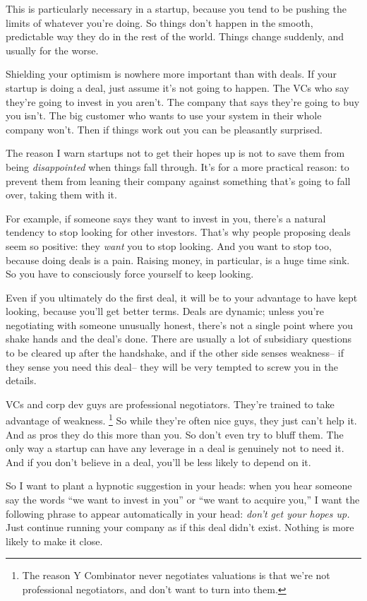 \documentclass[12pt]{book}
\begin{document}
This is particularly necessary in a startup, because you tend to be
pushing the limits of whatever you're doing. So things don't happen in
the smooth, predictable way they do in the rest of the world. Things
change suddenly, and usually for the worse.

Shielding your optimism is nowhere more important than with deals. If
your startup is doing a deal, just assume it's not going to happen. The
VCs who say they're going to invest in you aren't. The company that says
they're going to buy you isn't. The big customer who wants to use your
system in their whole company won't. Then if things work out you can be
pleasantly surprised.

The reason I warn startups not to get their hopes up is not to save them
from being \emph{disappointed} when things fall through. It's for a more
practical reason: to prevent them from leaning their company against
something that's going to fall over, taking them with it.

For example, if someone says they want to invest in you, there's a
natural tendency to stop looking for other investors. That's why people
proposing deals seem so positive: they \emph{want} you to stop looking.
And you want to stop too, because doing deals is a pain. Raising money,
in particular, is a huge time sink. So you have to consciously force
yourself to keep looking.

Even if you ultimately do the first deal, it will be to your advantage
to have kept looking, because you'll get better terms. Deals are
dynamic; unless you're negotiating with someone unusually honest,
there's not a single point where you shake hands and the deal's done.
There are usually a lot of subsidiary questions to be cleared up after
the handshake, and if the other side senses weakness-- if they sense you
need this deal-- they will be very tempted to screw you in the details.

VCs and corp dev guys are professional negotiators. They're trained to
take advantage of weakness. \footnote{The reason Y Combinator never negotiates valuations is that
we're not professional negotiators, and don't want to turn into them.} So while they're
often nice guys, they just can't help it. And as pros they do this more
than you. So don't even try to bluff them. The only way a startup can
have any leverage in a deal is genuinely not to need it. And if you
don't believe in a deal, you'll be less likely to depend on it.

So I want to plant a hypnotic suggestion in your heads: when you hear
someone say the words ``we want to invest in you'' or ``we want to
acquire you,'' I want the following phrase to appear automatically in
your head: \emph{don't get your hopes up.} Just continue running your
company as if this deal didn't exist. Nothing is more likely to make it
close.
\end{document}
